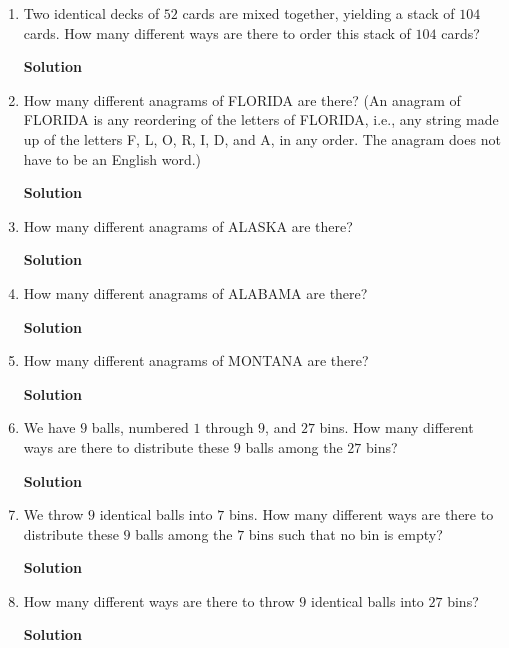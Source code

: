 \documentclass{article}\usepackage{amsmath,amssymb,amsthm,tikz,tkz-graph,color,chngpage,soul,hyperref,csquotes,graphicx,floatrow}\newcommand*{\QEDB}{\hfill\ensuremath{\square}}\newtheorem*{prop}{Proposition}\renewcommand{\theenumi}{\alph{enumi}}\usepackage[shortlabels]{enumitem}\usepackage[nobreak=true]{mdframed}\usetikzlibrary{matrix,calc}\MakeOuterQuote{"}\usepackage[margin=0.75in]{geometry} \newtheorem{theorem}{Theorem}
\begin{document}
\begin{enumerate}
\begin{mdframed}
\end{mdframed}
\item Two identical decks of $52$ cards are mixed together, yielding a stack of $104$ cards. How many different ways are there to order this stack of $104$ cards?
\begin{mdframed}
\textbf{Solution}

\end{mdframed}
\item How many different anagrams of FLORIDA are there? (An anagram of FLORIDA is any reordering of the letters of FLORIDA, i.e., any string made up of the letters F, L, O, R, I, D, and A, in any order. The anagram does not have to be an English word.)
\begin{mdframed}
\textbf{Solution}

\end{mdframed}
\item How many different anagrams of ALASKA are there?
\begin{mdframed}
\textbf{Solution}

\end{mdframed}
\item How many different anagrams of ALABAMA are there?
\begin{mdframed}
\textbf{Solution}

\end{mdframed}
\item How many different anagrams of MONTANA are there?
\begin{mdframed}
\textbf{Solution}

\end{mdframed}
\item We have $9$ balls, numbered $1$ through $9$, and $27$ bins. How many different ways are there to distribute these $9$ balls among the $27$ bins?
\begin{mdframed}
\textbf{Solution}

\end{mdframed}
\item We throw $9$ identical balls into $7$ bins. How many different ways are there to distribute these $9$ balls among the $7$ bins such that no bin is empty?
\begin{mdframed}
\textbf{Solution}

\end{mdframed}
\item How many different ways are there to throw $9$ identical balls into $27$ bins?
\begin{mdframed}
\textbf{Solution}


\end{mdframed}
\end{enumerate}
\end{document}

